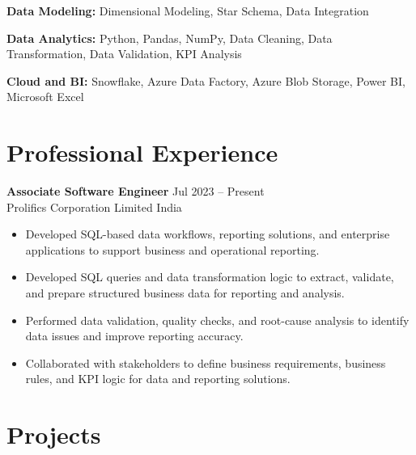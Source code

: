 \documentclass[10pt,a4paper]{article}
\newcommand{\resumeItem}[1]{
    \item \small{#1}
}
\newcommand{\resumeSubheading}[4]{
    \textbf{#1} \hfill #2\\
    {\small #3} \hfill {\small #4}\\[-2pt]
}
\begin{document}
\textbf{Data Modeling:}
Dimensional Modeling, Star Schema, Data Integration

\vspace{2pt}

\textbf{Data Analytics:}
Python, Pandas, NumPy, Data Cleaning, Data Transformation, Data Validation, KPI Analysis

\vspace{2pt}

\textbf{Cloud and BI:}
Snowflake, Azure Data Factory, Azure Blob Storage, Power BI, Microsoft Excel




\section{Professional Experience}

\vspace{4pt}

\resumeSubheading
{Associate Software Engineer}
{Jul 2023 -- Present}
{Prolifics Corporation Limited}
{India}

\begin{itemize}

\resumeItem{Developed SQL-based data workflows, reporting solutions, and enterprise applications to support business and operational reporting.}

\resumeItem{Developed SQL queries and data transformation logic to extract, validate, and prepare structured business data for reporting and analysis.}

\resumeItem{Performed data validation, quality checks, and root-cause analysis to identify data issues and improve reporting accuracy.}

\resumeItem{Collaborated with stakeholders to define business requirements, business rules, and KPI logic for data and reporting solutions.}

\end{itemize}




\section{Projects}
\end{document}
